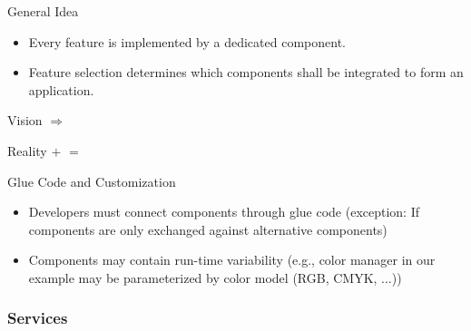 \begin{frame}{\myframetitle}
	\begin{mycolumns}[widths={40,60}]
		\begin{definition}{General Idea}			
			\begin{itemize}
				\item Every feature is implemented by a dedicated component.
				\item Feature selection determines which components shall be integrated to form an application.				
			\end{itemize}
		\end{definition}
		\begin{example}{Vision}
				\vspace*{\fill}
					$\Longrightarrow$ 
				\vspace*{\fill}	
		\end{example}
	\mynextcolumn
		\begin{example}{Reality}
				\vspace*{\fill}
					$+$ 
				\vspace*{\fill}	
				\vspace*{\fill}
					$=$ 
				\vspace*{\fill}	
		\end{example}	
		\begin{note}{Glue Code and Customization}
			\begin{itemize}
				\item Developers must connect components through glue code (exception: If components are only exchanged against alternative components)
				\item Components may contain run-time variability (e.g., color manager in our example may be parameterized by color model (RGB, CMYK, ...))
			\end{itemize}
		\end{note}
	\end{mycolumns}	
\end{frame}

\subsubsection*{Services}

